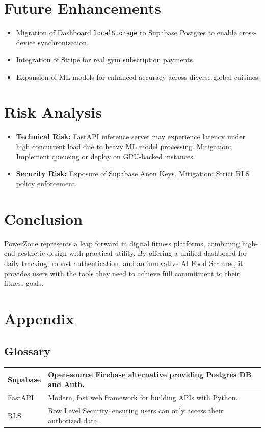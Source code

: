 \documentclass[12pt,a4paper]{article}
\begin{document}
\section{Future Enhancements}
\begin{itemize}
    \item Migration of Dashboard \texttt{localStorage} to Supabase Postgres to enable cross-device synchronization.
    \item Integration of Stripe for real gym subscription payments.
    \item Expansion of ML models for enhanced accuracy across diverse global cuisines.
\end{itemize}

\section{Risk Analysis}
\begin{itemize}
    \item \textbf{Technical Risk:} FastAPI inference server may experience latency under high concurrent load due to heavy ML model processing. Mitigation: Implement queueing or deploy on GPU-backed instances.
    \item \textbf{Security Risk:} Exposure of Supabase Anon Keys. Mitigation: Strict RLS policy enforcement.
\end{itemize}

\section{Conclusion}
PowerZone represents a leap forward in digital fitness platforms, combining high-end aesthetic design with practical utility. By offering a unified dashboard for daily tracking, robust authentication, and an innovative AI Food Scanner, it provides users with the tools they need to achieve full commitment to their fitness goals.

\section{Appendix}

\subsection{Glossary}
\begin{longtable}{|p{3cm}|p{11cm}|}
\hline
Supabase & Open-source Firebase alternative providing Postgres DB and Auth. \\
\hline
FastAPI & Modern, fast web framework for building APIs with Python. \\
\hline
RLS & Row Level Security, ensuring users can only access their authorized data. \\
\hline
\end{longtable}
\end{document}
